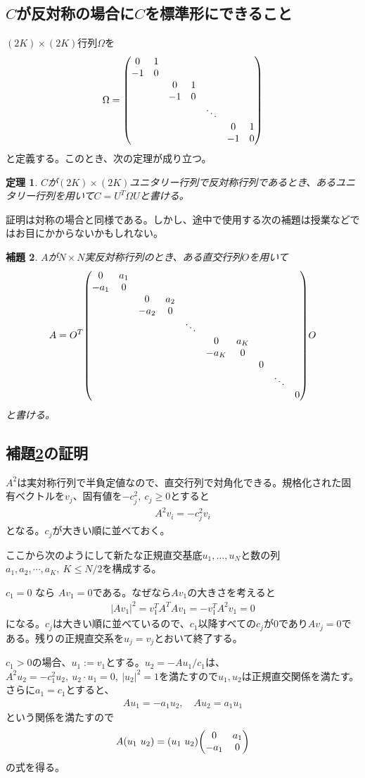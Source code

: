 \documentclass[12pt,a4paper]{jlreq}
\newtheorem{theo}{定理}
\newtheorem{lemma}[theo]{補題}
\begin{document}
\subsection{$C$が反対称の場合に$C$を標準形にできること}
$(2K)\times (2K)$行列$\Omega$を
\begin{align*}
  \Omega=
  \mqty(\dmat{0&1\\-1&0, 0&1\\-1&0,\ddots,0&1\\-1&0})
\end{align*}
と定義する。このとき、次の定理が成り立つ。
\begin{theo}
  $C$が$(2K)\times (2K)$ユニタリー行列で反対称行列であるとき、あるユニタリー行列を用いて$C=U^T\Omega U$と書ける。
\end{theo}

証明は対称の場合と同様である。しかし、途中で使用する次の補題は授業などではお目にかからないかもしれない。
\begin{lemma}\label{lemma}
  $A$が$N\times N$実反対称行列のとき、ある直交行列$O$を用いて
  \begin{align*}
    A=O^T 
    \mqty(\dmat{0&a_1\\-a_1&0, 0&a_2\\-a_2&0,\ddots,0&a_K\\-a_K&0, 0, \ddots,0})O
  \end{align*}
  と書ける。
\end{lemma}

\subsection{補題\ref{lemma}の証明}
$A^2$は実対称行列で半負定値なので、直交行列で対角化できる。規格化された固有ベクトルを$v_j$、固有値を$-c_j^2,\ c_j\ge 0$とすると
\begin{align*}
  A^2 v_i=-c_j^2v_i
\end{align*}
となる。$c_j$が大きい順に並べておく。

ここから次のようにして新たな正規直交基底$u_1,\dots,u_N$と数の列$a_1,a_2,\cdots,a_K,\ K\le N/2$を構成する。

$c_1=0$ なら
$Av_1=0$である。なぜなら$Av_1$の大きさを考えると
\begin{align*}
  |Av_1|^2=v_1^TA^TAv_1=-v_1^T A^2 v_1=0
\end{align*}
になる。$c_j$は大きい順に並べているので、$c_1$以降すべての$c_j$が0であり$Av_j=0$である。残りの正規直交系を$u_j=v_j$とおいて終了する。

$c_1 > 0$の場合、$u_1:=v_1$とする。$u_2=-A u_1/c_1$は、$A^2u_2=-c_1^2 u_2,\ u_2\cdot u_1=0,\ |u_2|^2=1$を満たすので$u_1,u_2$は正規直交関係を満たす。さらに$a_1=c_1$とすると、
\begin{align*}
  Au_1=-a_1u_2,\quad Au_2=a_1 u_1
\end{align*}
という関係を満たすので
\begin{align*}
  A(u_1 \ u_2)=(u_1\ u_2)\mqty(0&a_1\\-a_1&0)
\end{align*}
の式を得る。
\end{document}
